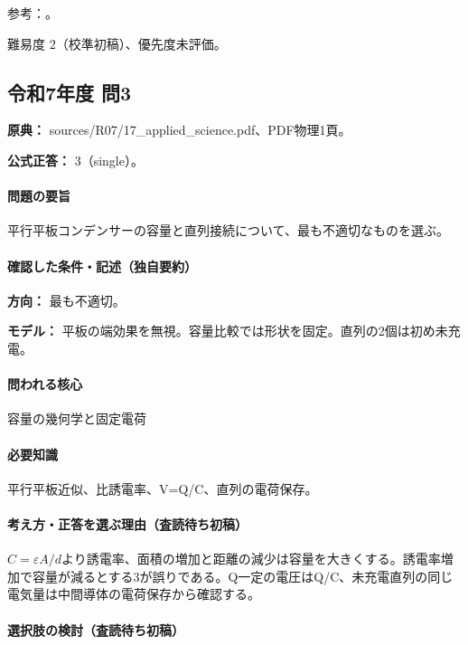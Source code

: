 \par 参考：\cite{mit_em05}。

\par 難易度 2（校準初稿）、優先度未評価。

\subsection{令和7年度 問3}
\label{q:r07-reg-applied-03}

\noindent\textbf{原典：} sources/R07/17\_applied\_science.pdf、PDF物理1頁。

\textbf{公式正答：} 3（single）。

\paragraph{問題の要旨} 平行平板コンデンサーの容量と直列接続について、最も不適切なものを選ぶ。

\paragraph{確認した条件・記述（独自要約）}\mbox{}\par

\noindent\textbf{方向：} 最も不適切。\par

\noindent\textbf{モデル：} 平板の端効果を無視。容量比較では形状を固定。直列の2個は初め未充電。\par

\paragraph{問われる核心} 容量の幾何学と固定電荷

\paragraph{必要知識} 平行平板近似、比誘電率、V=\allowbreak{}Q/C、直列の電荷保存。

\paragraph{考え方・正答を選ぶ理由（査読待ち初稿）} \(C=\varepsilon A/d\)より誘電率、面積の増加と距離の減少は容量を大きくする。誘電率増加で容量が減るとする3が誤りである。Q一定の電圧はQ/C、未充電直列の同じ電気量は中間導体の電荷保存から確認する。

\paragraph{選択肢の検討（査読待ち初稿）}\mbox{}\par

